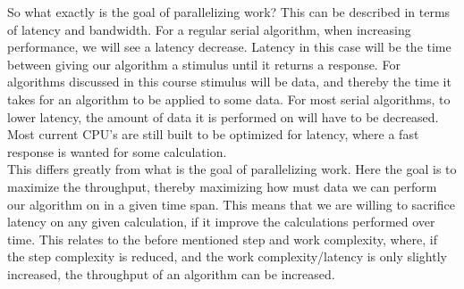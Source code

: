 So what exactly is the goal of parallelizing work? This can be described in terms of latency and bandwidth. For a regular serial algorithm, when increasing performance, we will see a latency decrease. Latency in this case will be the time between giving our algorithm a stimulus until it returns a response. For algorithms discussed in this course stimulus will be data, and thereby the time it takes for an algorithm to be applied to some data. For most serial algorithms, to lower latency, the amount of data it is performed on will have to be decreased. Most current CPU's are still built to be optimized for latency, where a fast response is wanted for some calculation.\\
This differs greatly from what is the goal of parallelizing work. Here the goal is to maximize the throughput, thereby maximizing how must data we can perform our algorithm on in a given time span. This means that we are willing to sacrifice latency on any given calculation, if it improve the calculations performed over time. This relates to the before mentioned step and work complexity, where, if the step complexity is reduced, and the work complexity/latency is only slightly increased, the throughput of an algorithm can be increased.